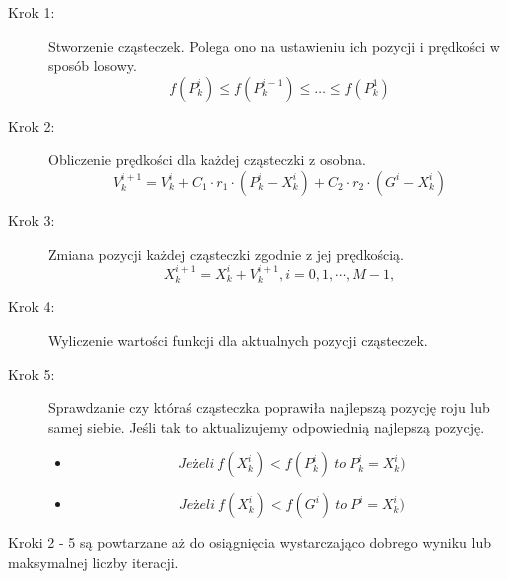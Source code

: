 \begin{description}
  \item[Krok 1:] 
     \par Stworzenie cząsteczek. Polega ono na ustawieniu ich pozycji i prędkości w sposób losowy. 
  \[f(P^{i}_{k}) \le f(P^{i-1}_{k}) \le \ldots \le f(P^{1}_{k})\]
  \item[Krok 2:]
    \par Obliczenie prędkości dla każdej cząsteczki z osobna. 
\[V^{i+1}_{k} = V^{i}_{k} + C_{1} \cdot r_{1} \cdot (P^{i}_{k} - X^{i}_{k}) + C_{2} \cdot r_{2} \cdot (G^{i} - X^{i}_{k})\]
  \item[Krok 3:]
        \par Zmiana pozycji każdej cząsteczki zgodnie z jej prędkością.
\[X^{i+1}_{k} = X^{i}_{k} + V^{i+1}_{k}, i = 0,1,\cdots, M-1,\]
  \item[Krok 4:]
        \par Wyliczenie wartości funkcji dla aktualnych pozycji cząsteczek.
  \item[Krok 5:] 
      \par Sprawdzanie czy któraś cząsteczka poprawiła najlepszą pozycję roju lub samej siebie. Jeśli tak to aktualizujemy odpowiednią najlepszą pozycję.
\begin{itemize}
    \item \[ Jeżeli\ f(X^{i}_{k}) \lt f(P^{i}_{k}) \ to \ P^{i}_{k} = X^{i}_{k})\]
    \item \[ Jeżeli\ f(X^{i}_{k}) \lt f(G^{i})\ to \  P^{i} = X^{i}_{k})\]
\end{itemize}

\end{description}
    \par Kroki 2 - 5 są powtarzane aż do osiągnięcia wystarczająco dobrego wyniku lub maksymalnej liczby iteracji.
